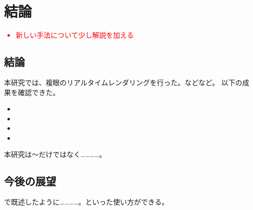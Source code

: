 \chapter{結論}
\label{CConclusion}

\textcolor{red}{
\begin{itemize}
\item 新しい手法について少し解説を加える
\end{itemize}
}

\section{結論}
\label{SConclusion}

本研究では、複眼のリアルタイムレンダリングを行った。などなど。
以下の成果を確認できた。

\begin{itemize}
\item 
\item 
\item 
\item 
\end{itemize}

本研究は～だけではなく…………。


\section{今後の展望}
\label{SFutureWork}

で既述したように…………。といった使い方ができる。


